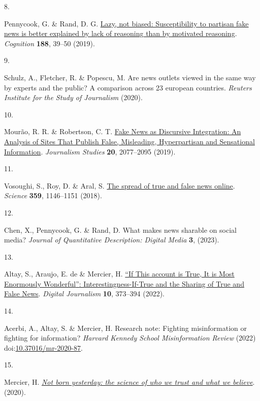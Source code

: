 \documentclass[
  doc,floatsintext]{apa6}
\newlength{\cslhangindent}
\newlength{\csllabelwidth}
\newenvironment{CSLReferences}[2] %
 {\begin{list}{}{%
  \setlength{\itemindent}{0pt}
  \setlength{\leftmargin}{0pt}
  \setlength{\parsep}{0pt}
  \ifodd #1
   \setlength{\leftmargin}{\cslhangindent}
   \setlength{\itemindent}{-1\cslhangindent}
  \fi
  \setlength{\itemsep}{#2\baselineskip}}}
 {\end{list}}
\newcommand{\CSLLeftMargin}[1]{\parbox[t]{\csllabelwidth}{\strut#1\strut}}
\newcommand{\CSLRightInline}[1]{\parbox[t]{\linewidth - \csllabelwidth}{\strut#1\strut}}
\begin{document}
\begin{CSLReferences}{0}{0}
\CSLLeftMargin{8. }%
\CSLRightInline{*Pennycook, G. \& Rand, D. G. \href{https://doi.org/10.1016/j.cognition.2018.06.011}{Lazy, not biased: Susceptibility to partisan fake news is better explained by lack of reasoning than by motivated reasoning}. \emph{Cognition} \textbf{188}, 39--50 (2019).}

\CSLLeftMargin{9. }%
\CSLRightInline{Schulz, A., Fletcher, R. \& Popescu, M. Are news outlets viewed in the same way by experts and the public? A comparison across 23 european countries. \emph{Reuters Institute for the Study of Journalism} (2020).}

\CSLLeftMargin{10. }%
\CSLRightInline{Mourão, R. R. \& Robertson, C. T. \href{https://doi.org/10.1080/1461670X.2019.1566871}{Fake News as Discursive Integration: An Analysis of Sites That Publish False, Misleading, Hyperpartisan and Sensational Information}. \emph{Journalism Studies} \textbf{20}, 2077--2095 (2019).}

\CSLLeftMargin{11. }%
\CSLRightInline{Vosoughi, S., Roy, D. \& Aral, S. \href{https://doi.org/10.1126/science.aap9559}{The spread of true and false news online}. \emph{Science} \textbf{359}, 1146--1151 (2018).}

\CSLLeftMargin{12. }%
\CSLRightInline{*Chen, X., Pennycook, G. \& Rand, D. What makes news sharable on social media? \emph{Journal of Quantitative Description: Digital Media} \textbf{3}, (2023).}

\CSLLeftMargin{13. }%
\CSLRightInline{*Altay, S., Araujo, E. de \& Mercier, H. \href{https://doi.org/10.1080/21670811.2021.1941163}{{``}If This account is True, It is Most Enormously Wonderful{''}: Interestingness-If-True and the Sharing of True and False News}. \emph{Digital Journalism} \textbf{10}, 373--394 (2022).}

\CSLLeftMargin{14. }%
\CSLRightInline{Acerbi, A., Altay, S. \& Mercier, H. Research note: Fighting misinformation or fighting for information? \emph{Harvard Kennedy School Misinformation Review} (2022) doi:\href{https://doi.org/10.37016/mr-2020-87}{10.37016/mr-2020-87}.}

\CSLLeftMargin{15. }%
\CSLRightInline{Mercier, H. \emph{\href{https://doi.org/10.1515/9780691198842}{Not born yesterday: the science of who we trust and what we believe}}. (2020).}


\end{CSLReferences}
\end{document}
